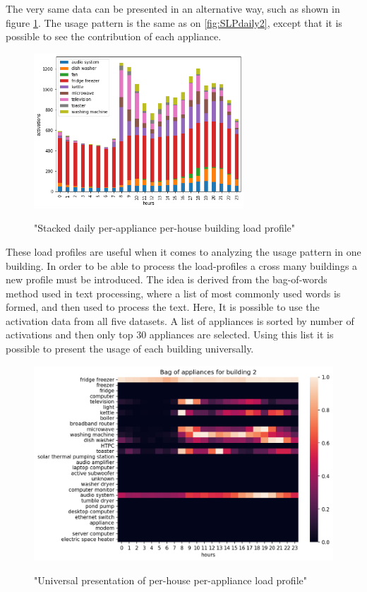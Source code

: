 The very same data can be presented in an alternative way, such as shown in figure \ref{fig:stack}.
The usage pattern is the same as on \ref{fig:SLPdaily2}, except that it is possible to see
the contribution of each appliance. 

\begin{figure}[H]
	\centering
	\caption{"Stacked daily per-appliance per-house building load profile"}
	\includegraphics[width=0.7\textwidth]{../Figures/LPS/stack.png}
	\label{fig:stack}
\end{figure}

These load profiles are useful when it comes to analyzing the usage pattern in one building.
In order to be able to process the load-profiles a cross many buildings a new profile must be introduced.
The idea is derived from the bag-of-words method used in text processing, where a list of most commonly used words is formed, and then used to process the text. 
Here, It is possible to use the activation data from all five datasets.
A list of appliances is sorted by number of activations and then only top 30 appliances are selected.
Using this list it is possible to present the usage of each building universally.

\begin{figure}[H]
	\centering
	\caption{"Universal presentation of per-house per-appliance load profile"}
	\includegraphics[width=1\textwidth]{../Figures/LPS/BOA.png}
	\label{fig:BOA}
\end{figure}


